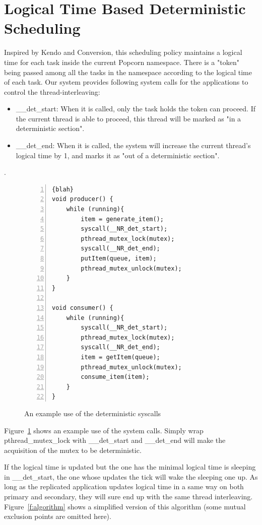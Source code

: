 \section{Logical Time Based Deterministic Scheduling} \label{sec:detsched}
Inspired by Kendo and Conversion, this scheduling policy maintains a logical time for each task inside the current Popcorn namespace. There is a "token" being passed among all the tasks in the namespace according to the logical time of each task. Our system provides following system calls for the applications to control the thread-interleaving:
\begin{itemize}
   \item \_\_det\_start: When it is called, only the task holds the token can proceed. If the current thread is able to proceed, this thread will be marked as "in a deterministic section".
   \item \_\_det\_end: When it is called, the system will increase the current thread's logical time by 1, and marks it as "out of a deterministic section".
\end{itemize}.

\begin{figure}
\centering
\begin{lstlisting}[numbers=left, frame=single, basicstyle=\small, breaklines]{blah}
void producer() {
    while (running){
        item = generate_item();
        syscall(__NR_det_start);
        pthread_mutex_lock(mutex);
        syscall(__NR_det_end);    
        putItem(queue, item);    
        pthread_mutex_unlock(mutex);
    }
}

void consumer() {
    while (running){
        syscall(__NR_det_start);
        pthread_mutex_lock(mutex);
        syscall(__NR_det_end);
        item = getItem(queue);    
        pthread_mutex_unlock(mutex);		
        consume_item(item);
    }
}
\end{lstlisting}
\caption{An example use of the deterministic syscalls}
\label{fig:example}
\end{figure}
Figure~\ref{fig:example} shows an example use of the system calls. Simply wrap pthread\_mutex\_lock with \_\_det\_start and \_\_det\_end will make the acquisition of the mutex to be deterministic.

If the logical time is updated but the one has the minimal logical time is sleeping in \_\_det\_start, the one whose updates the tick will wake the sleeping one up. As long as the replicated application updates logical time in a same way on both primary and secondary, they will sure end up with the same thread interleaving. Figure~\ref{f:algorithm} shows a simplified version of this algorithm (some mutual exclusion points are omitted here).

